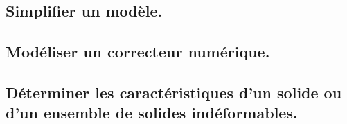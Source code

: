 \documentclass[10pt,fleqn]{book}
\newcommand{\repRel}{../..}
\newcommand{\repStyle}{\repRel/Style}
\newcommand{\td}{fichier_td}
\newcommand{\repExos}{\repRel/ExercicesCompetences}
\newcommand{\repExo}{dossier}
\begin{document}
\renewcommand{\repExo}{\repExos/B2_ProposerModele/B2_07_ModelisationSchemaBlocs/71_Robovolc}
\renewcommand{\td}{71_Robovolc}
\graphicspath{{\repStyle/png/}{\repExo/images/}}


\renewcommand{\repExo}{\repExos/B2_ProposerModele/B2_07_ModelisationSchemaBlocs/77_ProtheseTibia}
\renewcommand{\td}{77_ProtheseTibia}
\graphicspath{{\repStyle/png/}{\repExo/images/}}


\renewcommand{\repExo}{\repExos/B2_ProposerModele/B2_07_ModelisationSchemaBlocs/78_RobotDaVinci}
\renewcommand{\td}{78_RobotDaVinci}
\graphicspath{{\repStyle/png/}{\repExo/images/}}


\renewcommand{\repExo}{\repExos/B2_ProposerModele/B2_07_ModelisationSchemaBlocs/79_Tuyere}
\renewcommand{\td}{79_Tuyere}
\graphicspath{{\repStyle/png/}{\repExo/images/}}


\renewcommand{\repExo}{\repExos/B2_ProposerModele/B2_07_ModelisationSchemaBlocs/80_Clever}
\renewcommand{\td}{80_Clever}
\graphicspath{{\repStyle/png/}{\repExo/images/}}


\subsection{Simplifier un modèle.} 

\subsection{Modéliser un correcteur numérique. } 

\subsection{Déterminer les caractéristiques d'un solide ou d'un ensemble de solides indéformables.} 

\renewcommand{\repExo}{\repExos/B2_ProposerModele/B2_10_CartacteristiquesSolides/40_Parallelepipede}
\renewcommand{\td}{40_Parallelepipede}
\graphicspath{{\repStyle/png/}{\repExo/images/}}


\renewcommand{\repExo}{\repExos/B2_ProposerModele/B2_10_CartacteristiquesSolides/41_Parallelepipede}
\renewcommand{\td}{41_Parallelepipede}
\graphicspath{{\repStyle/png/}{\repExo/images/}}


\renewcommand{\repExo}{\repExos/B2_ProposerModele/B2_10_CartacteristiquesSolides/42_Cylindre}
\renewcommand{\td}{42_Cylindre}
\graphicspath{{\repStyle/png/}{\repExo/images/}}

\end{document}
